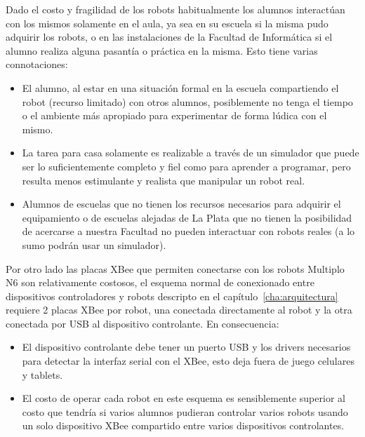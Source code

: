 Dado el costo y fragilidad de los robots habitualmente los alumnos interactúan
con los mismos solamente en el aula, ya sea en su escuela si la misma pudo
adquirir los robots, o en las instalaciones de la  Facultad de Informática si el alumno
realiza alguna pasantía o práctica en la misma. Esto tiene varias connotaciones:
\begin{itemize}
    \item El alumno, al estar en una situación formal en la escuela
        compartiendo el robot (recurso limitado) con otros
        alumnos, posiblemente no tenga el tiempo o el ambiente más apropiado
        para experimentar de forma lúdica con el mismo.
    \item La tarea para casa solamente es realizable a través de un simulador
        que puede ser lo suficientemente completo y fiel como para aprender
        a programar, pero resulta menos estimulante y realista que manipular
        un robot real.
    \item Alumnos de escuelas que no tienen los recursos necesarios para
        adquirir el equipamiento o de escuelas alejadas de La Plata que
        no tienen la posibilidad de acercarse a nuestra
        Facultad no pueden interactuar con robots reales
        (a lo sumo podrán usar un simulador).
\end{itemize}

Por otro lado las placas
XBee que permiten conectarse con los robots Multiplo N6
son relativamente costosos, el esquema normal de conexionado entre dispositivos
controladores y robots descripto en el capítulo~\ref{cha:arquitectura} requiere
2 placas XBee por robot, una conectada directamente al robot y la otra
conectada por USB al dispositivo controlante. En consecuencia:
\begin{itemize}
    \item El dispositivo controlante debe tener un puerto USB y los drivers
        necesarios para detectar la interfaz serial con el XBee, esto deja
        fuera de juego celulares y tablets.
    \item El costo de operar cada robot en este esquema es sensiblemente
        superior al costo que tendría si varios alumnos pudieran
        controlar varios robots usando un solo dispositivo XBee compartido
        entre varios dispositivos controlantes.
\end{itemize}

